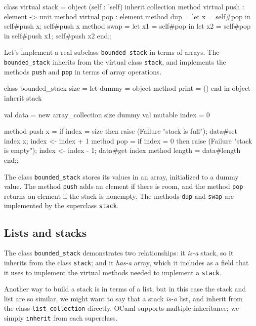 \begin{ocaml}
class virtual stack =
object (self : 'self)
   inherit collection
   method virtual push : element -> unit
   method virtual pop  : element
   method dup =
      let x = self#pop in
      self#push x;
      self#push x
   method swap =
      let x1 = self#pop in
      let x2 = self#pop in
      self#push x1;
      self#push x2
end;;
\end{ocaml}
%
Let's implement a real subclass \hbox{\lstinline/bounded_stack/} in terms of arrays.
The \hbox{\lstinline/bounded_stack/} inherits from the virtual class \hbox{\lstinline/stack/}, and implements the
methods \hbox{\lstinline/push/} and \hbox{\lstinline/pop/} in terms of array operations.

\begin{ocaml}
class bounded_stack size =
let dummy = object method print = () end in
object
   inherit stack

   val data = new array_collection size dummy
   val mutable index = 0

   method push x =
      if index = size then
         raise (Failure "stack is full");
      data#set index x;
      index <- index + 1
   method pop =
      if index = 0 then
         raise (Failure "stack is empty");
      index <- index - 1;
      data#get index
   method length = data#length
end;;
\end{ocaml}
%
The class \hbox{\lstinline/bounded_stack/} stores its values in an array, initialized to a dummy value.
The method \hbox{\lstinline/push/} adds an element if there is room, and the method \hbox{\lstinline/pop/} returns
an element if the stack is nonempty.  The methods \hbox{\lstinline/dup/} and \hbox{\lstinline/swap/} are
implemented by the superclass \hbox{\lstinline/stack/}.

\subsection{Lists and stacks}

The class \hbox{\lstinline/bounded_stack/} demonstrates two relationships: it \emph{is-a} stack, so it
inherits from the class \hbox{\lstinline/stack/}; and it \emph{has-a} array, which it includes as a field
that it uses to implement the virtual methods needed to implement a \hbox{\lstinline/stack/}.

Another way to build a stack is in terms of a list, but in this case the stack and list are so
similar, we might want to say that a stack \emph{is-a} list, and inherit from the
class \hbox{\lstinline/list_collection/} directly.  OCaml supports multiple inheritance; we
simply \hbox{\lstinline/inherit/} from each superclass.

